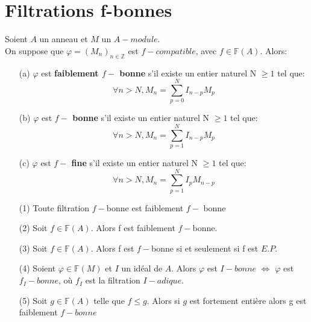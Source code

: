 \section{Filtrations f-bonnes}
\begin{madefinition}
	\label{maprop11}
	Soient $A$ un anneau et $M$ un $A-module$.\\
	On suppose que $\varphi=(M_n)_{n \in \mathbb{Z}}$ est $f-compatible$, avec $f \in \mathbb{F}(A)$. Alors:
	\begin{itemize}
		\item[(a)] $\varphi$ est \textbf{faiblement $f-$ bonne} s'il existe un entier naturel N $\geqslant 1$ tel que:
		\[\forall n > N, M_{n}=\sum_{p=0}^{N}I_{n-p}M_{p} \]
		\item[(b)] $\varphi$ est \textbf{$f-$ bonne} s'il existe un entier naturel N $\geqslant 1$ tel que:
		\[\forall n > N, M_{n}=\sum_{p=1}^{N}I_{n-p}M_{p} \]
		\item[(c)] $\varphi$ est \textbf{$f-$ fine} s'il existe un entier naturel N $\geqslant 1$ tel que:
		\[\forall n > N, M_{n}=\sum_{p=1}^{N}I_{p}M_{n-p} \]
	\end{itemize} 
\end{madefinition}
\begin{maremarque}
	\label{maprop6}
	\begin{enumerate}
		\item[(1)] Toute filtration $f-$bonne est faiblement $f-$ bonne
		\item[(2)] Soit $f \in \mathbb{F}(A)$. Alors f est faiblement $f-$bonne.
		\item[(3)] Soit $f \in \mathbb{F}(A)$. Alors f est $f-$bonne si et seulement si f est $E.P.$
		\item[(4)] Soient $\varphi \in \mathbb{F}(M)$ et $I$ un idéal de $A$. Alors $\varphi$ est $I-bonne$ $\Longleftrightarrow$ $\varphi$ est $f_{I}-bonne$, où $f_{I}$ est la filtration $I-adique$.
		\item[(5)] Soit $g \in \mathbb{F}(A)$ telle que $f \leqslant g$. Alors si $g$ est fortement entière alors g est faiblement $f-bonne$
	\end{enumerate}
\end{maremarque}

